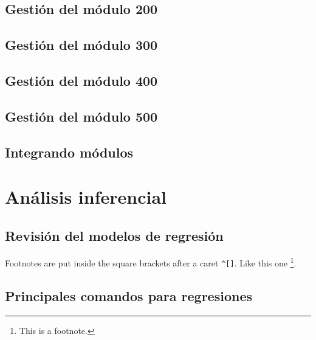 \documentclass[
]{book}
\theoremstyle{definition}
\theoremstyle{definition}
\theoremstyle{definition}
\theoremstyle{definition}
\theoremstyle{remark}
\begin{document}
\hypertarget{gestiuxf3n-del-muxf3dulo-200}{%
\section{Gestión del módulo 200}\label{gestiuxf3n-del-muxf3dulo-200}}

\hypertarget{gestiuxf3n-del-muxf3dulo-300}{%
\section{Gestión del módulo 300}\label{gestiuxf3n-del-muxf3dulo-300}}

\hypertarget{gestiuxf3n-del-muxf3dulo-400}{%
\section{Gestión del módulo 400}\label{gestiuxf3n-del-muxf3dulo-400}}

\hypertarget{gestiuxf3n-del-muxf3dulo-500}{%
\section{Gestión del módulo 500}\label{gestiuxf3n-del-muxf3dulo-500}}

\hypertarget{integrando-muxf3dulos}{%
\section{Integrando módulos}\label{integrando-muxf3dulos}}

\hypertarget{anuxe1lisis-inferencial}{%
\chapter{Análisis inferencial}\label{anuxe1lisis-inferencial}}

\hypertarget{revisiuxf3n-del-modelos-de-regresiuxf3n}{%
\section{Revisión del modelos de regresión}\label{revisiuxf3n-del-modelos-de-regresiuxf3n}}

Footnotes are put inside the square brackets after a caret \texttt{\^{}{[}{]}}. Like this one \footnote{This is a footnote.}.

\hypertarget{principales-comandos-para-regresiones}{%
\section{Principales comandos para regresiones}\label{principales-comandos-para-regresiones}}
\end{document}
